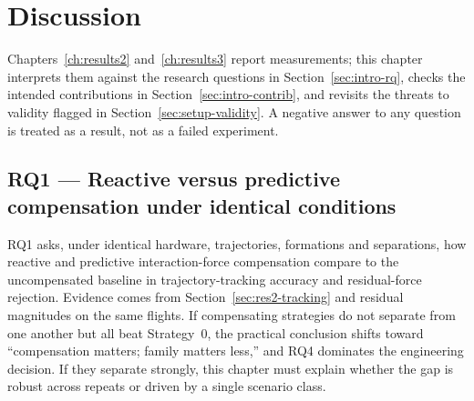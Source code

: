 %
%
%

\chapter{Discussion}
\label{ch:discussion}

Chapters~\ref{ch:results2} and~\ref{ch:results3} report measurements; this chapter interprets them
against the research questions in Section~\ref{sec:intro-rq}, checks the intended contributions in
Section~\ref{sec:intro-contrib}, and revisits the threats to validity flagged in
Section~\ref{sec:setup-validity}. A negative answer to any question is treated as a result, not as
a failed experiment.

\section{RQ1 --- Reactive versus predictive compensation under identical conditions}
\label{sec:disc-rq1}

RQ1 asks, under identical hardware, trajectories, formations and separations, how reactive and
predictive interaction-force compensation compare to the uncompensated baseline in trajectory-tracking
accuracy and residual-force rejection. Evidence comes from Section~\ref{sec:res2-tracking} and
residual magnitudes on the same flights. If compensating strategies do not separate from one another
but all beat Strategy~0, the practical conclusion shifts toward ``compensation matters; family
matters less,'' and RQ4 dominates the engineering decision. If they separate strongly, this chapter
must explain whether the gap is robust across repeats or driven by a single scenario class.


